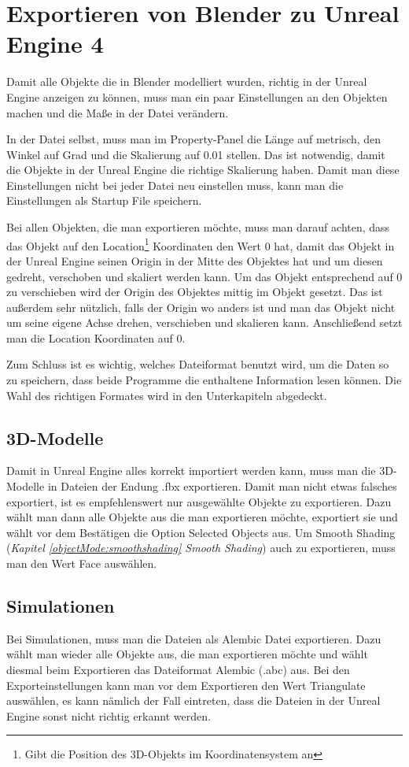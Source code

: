 \section{Exportieren von Blender zu Unreal Engine 4}
\label{Exportieren_von_Blender_zu_Unreal_Engine_4:ref1}
Damit alle Objekte die in Blender modelliert wurden, richtig in der Unreal Engine anzeigen zu können, muss man ein paar
Einstellungen an den Objekten machen und die Maße in der Datei verändern.

In der Datei selbst, muss man im Property-Panel die Länge auf metrisch, den Winkel auf Grad und die Skalierung auf 0.01 stellen.
Das ist notwendig, damit die Objekte in der Unreal Engine die richtige Skalierung haben. Damit man diese Einstellungen nicht bei
jeder Datei neu einstellen muss, kann man die Einstellungen als Startup File speichern.

Bei allen Objekten, die man exportieren möchte, muss man darauf achten, dass das Objekt auf den Location\footnote{Gibt die Position des 3D-Objekts im Koordinatensystem an} Koordinaten
den Wert 0 hat, damit das Objekt in der Unreal Engine seinen Origin in der Mitte des Objektes hat und um diesen gedreht, verschoben und skaliert werden kann.
Um das Objekt entsprechend auf 0 zu verschieben wird der Origin des Objektes mittig im Objekt gesetzt. Das ist außerdem sehr nützlich, falls der Origin wo anders ist und man das
Objekt nicht um seine eigene Achse drehen, verschieben und skalieren kann. Anschließend setzt man die Location Koordinaten auf 0.

Zum Schluss ist es wichtig, welches Dateiformat benutzt wird, um die Daten so zu speichern, dass beide Programme die enthaltene
Information lesen können. Die Wahl des richtigen Formates wird in den Unterkapiteln abgedeckt.

\subsection{3D-Modelle}
Damit in Unreal Engine alles korrekt importiert werden kann, muss man die 3D-Modelle in Dateien der Endung .fbx exportieren.
Damit man nicht etwas falsches exportiert, ist es empfehlenswert nur ausgewählte Objekte zu exportieren. Dazu wählt man dann alle
Objekte aus die man exportieren möchte, exportiert sie und wählt vor dem Bestätigen die Option Selected Objects aus.
Um Smooth Shading (\textit{Kapitel \ref{objectMode:smoothshading} \dq Smooth Shading\dq})
auch zu exportieren, muss man den Wert Face auswählen.

\subsection{Simulationen}
\label{Simulation_Heading}
Bei Simulationen, muss man die Dateien als Alembic Datei exportieren. Dazu wählt man wieder alle Objekte aus, die man exportieren möchte und
wählt diesmal beim Exportieren das Dateiformat Alembic (.abc) aus. Bei den Exporteinstellungen kann man vor dem Exportieren den Wert Triangulate auswählen,
es kann nämlich der Fall eintreten, dass die Dateien in der Unreal Engine sonst nicht richtig erkannt werden.
